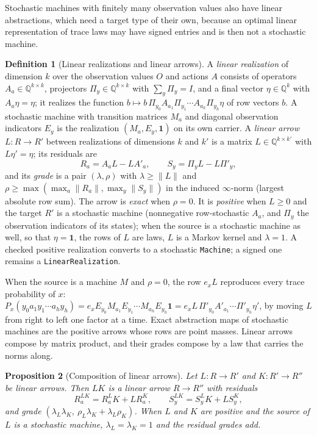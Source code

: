 \documentclass[11pt]{article}
\newcommand{\code}[1]{\texttt{#1}}
\newcommand{\Q}{\mathbb{Q}}
\theoremstyle{definition}
\newtheorem{definition}{Definition}[section]
\theoremstyle{plain}
\newtheorem{proposition}[definition]{Proposition}
\begin{document}
Stochastic machines with finitely many observation values also have linear abstractions, which
need a target type of their own, because an optimal linear representation of trace laws may have
signed entries and is then not a stochastic machine.

\begin{definition}[Linear realizations and linear arrows]\label{def:linear}
A \emph{linear realization} of dimension $k$ over the observation values $O$ and actions $A$
consists of operators $A_a\in\Q^{k\times k}$, projectors $\Pi_y\in\Q^{k\times k}$ with
$\sum_y\Pi_y=I$, and a final vector $\eta\in\Q^k$ with $A_a\eta=\eta$; it realizes the function
$b\mapsto b\,\Pi_{y_0}A_{a_1}\Pi_{y_1}\cdots A_{a_h}\Pi_{y_h}\eta$ of row vectors $b$. A stochastic
machine with transition matrices $M_a$ and diagonal observation indicators $E_y$ is the
realization $(M_a,E_y,\mathbf 1)$ on its own carrier. A \emph{linear arrow} $L:R\to R'$ between
realizations of dimensions $k$ and $k'$ is a matrix $L\in\Q^{k\times k'}$ with $L\eta'=\eta$; its
residuals are
\[
R_a=A_aL-LA'_a,\qquad S_y=\Pi_yL-L\Pi'_y,
\]
and its \emph{grade} is a pair $(\lambda,\rho)$ with $\lambda\ge\|L\|$ and
$\rho\ge\max(\max_a\|R_a\|,\max_y\|S_y\|)$ in the induced $\infty$-norm (largest absolute row
sum). The arrow is \emph{exact} when $\rho=0$. It is \emph{positive} when $L\ge0$ and the target $R'$ is a
stochastic machine (nonnegative row-stochastic $A_a$, and $\Pi_y$ the observation indicators of
its states); when the source is a stochastic machine as well, so that $\eta=\mathbf 1$, the rows of
$L$ are laws, $L$ is a Markov kernel and $\lambda=1$. A checked positive
realization converts to a stochastic \code{Machine}; a signed one remains a
\code{LinearRealization}.
\end{definition}

When the source is a machine $M$ and $\rho=0$, the row $e_xL$ reproduces every trace probability
of $x$: $P_x(y_0a_1y_1\cdots a_hy_h)=e_xE_{y_0}M_{a_1}E_{y_1}\cdots M_{a_h}E_{y_h}\mathbf 1
=e_xL\,\Pi'_{y_0}A'_{a_1}\cdots\Pi'_{y_h}\eta'$, by moving $L$ from right to left one factor at a
time.
Exact abstraction maps of stochastic machines are the positive arrows whose rows are point
masses. Linear arrows compose by matrix product, and their grades compose by a law that carries
the norms along.

\begin{proposition}[Composition of linear arrows]\label{prop:linearcomp}
Let $L:R\to R'$ and $K:R'\to R''$ be linear arrows. Then $LK$ is a linear arrow $R\to R''$ with
residuals
\[
R^{LK}_a=R^L_aK+LR^K_a,\qquad S^{LK}_y=S^L_yK+LS^K_y,
\]
and grade $(\lambda_L\lambda_K,\ \rho_L\lambda_K+\lambda_L\rho_K)$. When $L$ and $K$ are
positive and the source of $L$ is a stochastic machine, $\lambda_L=\lambda_K=1$ and the residual
grades add.
\end{proposition}
\end{document}
